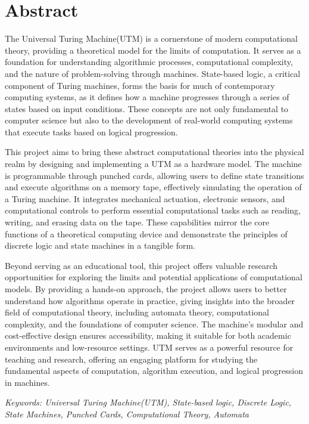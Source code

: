 \chapter*{Abstract}

The Universal Turing Machine(UTM) is a cornerstone of modern computational theory, providing a theoretical model for the limits of computation. It serves as a foundation for understanding algorithmic processes, computational complexity, and the nature of problem-solving through machines. State-based logic, a critical component of Turing machines, forms the basis for much of contemporary computing systems, as it defines how a machine progresses through a series of states based on input conditions. These concepts are not only fundamental to computer science but also to the development of real-world computing systems that execute tasks based on logical progression.

This project aims to bring these abstract computational theories into the physical realm by designing and implementing a UTM as a hardware model. The machine is programmable through punched cards, allowing users to define state transitions and execute algorithms on a memory tape, effectively simulating the operation of a Turing machine. It integrates mechanical actuation, electronic sensors, and computational controls to perform essential computational tasks such as reading, writing, and erasing data on the tape. These capabilities mirror the core functions of a theoretical computing device and demonstrate the principles of discrete logic and state machines in a tangible form.

Beyond serving as an educational tool, this project offers valuable research opportunities for exploring the limits and potential applications of computational models. By providing a hands-on approach, the project allows users to better understand how algorithms operate in practice, giving insights into the broader field of computational theory, including automata theory, computational complexity, and the foundations of computer science. The machine's modular and cost-effective design ensures accessibility, making it suitable for both academic environments and low-resource settings. UTM serves as a powerful resource for teaching and research, offering an engaging platform for studying the fundamental aspects of computation, algorithm execution, and logical progression in machines.

\vspace{24pt}
\textit{Keywords: Universal Turing Machine(UTM), State-based logic, Discrete Logic, State Machines, Punched Cards, Computational Theory, Automata}
